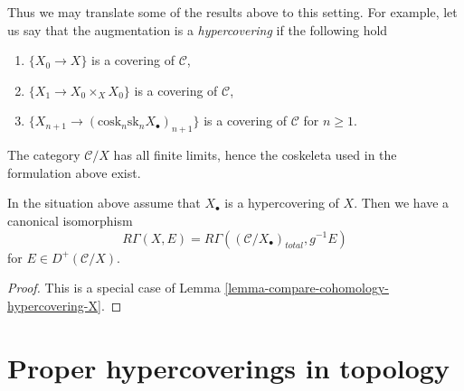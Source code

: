 \medskip\noindent
Thus we may translate some of the results above to this setting.
For example, let us say that the augmentation is a {\it hypercovering}
if the following hold
\begin{enumerate}
\item $\{X_0 \to X\}$ is a covering of $\mathcal{C}$,
\item $\{X_1 \to X_0 \times_X X_0\}$ is a covering of $\mathcal{C}$,
\item $\{X_{n + 1} \to (\text{cosk}_n\text{sk}_n X_\bullet)_{n + 1}\}$
is a covering of $\mathcal{C}$ for $n \geq 1$.
\end{enumerate}
The category $\mathcal{C}/X$ has all finite limits, hence the
coskeleta used in the formulation above exist.

\begin{lemma}
\label{lemma-compare-cohomology-hypercovering-X-simple}
In the situation above assume that $X_\bullet$ is a hypercovering of $X$.
Then we have a canonical isomorphism
$$
R\Gamma(X, E) = R\Gamma((\mathcal{C}/X_\bullet)_{total}, g^{-1}E)
$$
for $E \in D^+(\mathcal{C}/X)$.
\end{lemma}

\begin{proof}
This is a special case of
Lemma \ref{lemma-compare-cohomology-hypercovering-X}.
\end{proof}








\section{Proper hypercoverings in topology}
\label{section-proper-hypercovering}

